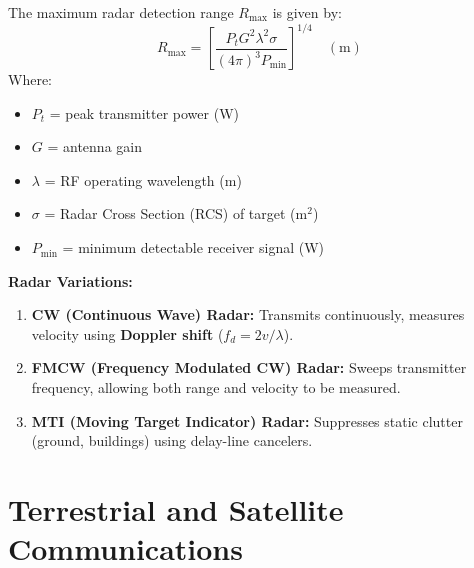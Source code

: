 \documentclass[12pt,a4paper]{article}
\begin{document}
\begin{tcolorbox}[formulabox, title={\textbf{Radar Range Equation}}]
The maximum radar detection range $R_{\text{max}}$ is given by:
\begin{equation}
  R_{\text{max}} = \left[ \frac{P_t G^2 \lambda^2 \sigma}{(4\pi)^3 P_{\text{min}}} \right]^{\!1/4} \quad (\text{m})
\end{equation}
Where:
\begin{itemize}[leftmargin=1.5em, itemsep=1pt, topsep=2pt]
  \item[] $P_t$ = peak transmitter power (W)
  \item[] $G$ = antenna gain
  \item[] $\lambda$ = RF operating wavelength (m)
  \item[] $\sigma$ = Radar Cross Section (RCS) of target ($\text{m}^2$)
  \item[] $P_{\text{min}}$ = minimum detectable receiver signal (W)
\end{itemize}
\end{tcolorbox}

\textbf{Radar Variations:}
\begin{enumerate}[leftmargin=*, itemsep=3pt]
  \item \textbf{CW (Continuous Wave) Radar:} Transmits continuously, measures velocity using \textbf{Doppler shift} ($f_d = 2v/\lambda$).
  \item \textbf{FMCW (Frequency Modulated CW) Radar:} Sweeps transmitter frequency, allowing both range and velocity to be measured.
  \item \textbf{MTI (Moving Target Indicator) Radar:} Suppresses static clutter (ground, buildings) using delay-line cancelers.
\end{enumerate}

\section{Terrestrial and Satellite Communications}

\begin{tcolorbox}[tikzbox, title={Satellite Uplink/Downlink Path Schematic}]
\centering
{}
\end{tcolorbox}
\end{document}
